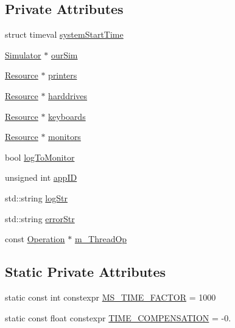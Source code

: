 \subsection*{Private Attributes}
\begin{DoxyCompactItemize}
\item 
struct timeval \hyperlink{class_application_aefd0ae255459653db9ccf40ce8d71db2}{system\+Start\+Time}
\item 
\hyperlink{class_simulator}{Simulator} $\ast$ \hyperlink{class_application_acde9fbff36a1944448c5c7a4f955ed60}{our\+Sim}
\item 
\hyperlink{class_resource}{Resource} $\ast$ \hyperlink{class_application_ad36f40feace83b72030e43a91a67fdd7}{printers}
\item 
\hyperlink{class_resource}{Resource} $\ast$ \hyperlink{class_application_ade3a6b2853f1e85a0d529b77ae2714eb}{harddrives}
\item 
\hyperlink{class_resource}{Resource} $\ast$ \hyperlink{class_application_a188f7116c66c50005003d764952398d7}{keyboards}
\item 
\hyperlink{class_resource}{Resource} $\ast$ \hyperlink{class_application_a77952fc678e1a136dba5835a19db9bd9}{monitors}
\item 
bool \hyperlink{class_application_a3ace413063712e18aa3865ce2bb9cf15}{log\+To\+Monitor}
\item 
unsigned int \hyperlink{class_application_ab60884b656840152d696b93a272ed2b0}{app\+ID}
\item 
std\+::string \hyperlink{class_application_affa9d19dc0697793200d839aea5dd094}{log\+Str}
\item 
std\+::string \hyperlink{class_application_a53c5168b721c9fc637c21f90abf1772b}{error\+Str}
\item 
const \hyperlink{struct_operation}{Operation} $\ast$ \hyperlink{class_application_adedd5777c96839e4238b9956855f3965}{m\+\_\+\+Thread\+Op}
\end{DoxyCompactItemize}
\subsection*{Static Private Attributes}
\begin{DoxyCompactItemize}
\item 
static const int constexpr \hyperlink{class_application_a9caeb1eb00810fa4750e8f5f4d0ad1a5}{M\+S\+\_\+\+T\+I\+M\+E\+\_\+\+F\+A\+C\+T\+OR} = 1000
\item 
static const float constexpr \hyperlink{class_application_af90ef45c56a06dc84388443ea24f40a0}{T\+I\+M\+E\+\_\+\+C\+O\+M\+P\+E\+N\+S\+A\+T\+I\+ON} = -\/0.
\end{DoxyCompactItemize}
